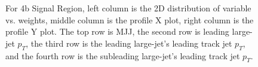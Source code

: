 \begin{figure}[htbp!]
\begin{center}
\caption{For 4b Signal Region, left column is the 2D distribution of variable vs. weights, middle column is the profile X plot, right column is the profile Y plot. The top row is MJJ, the second row is leading large-\R jet $p_{T}$, the third row is the leading large-\R jet's leading track jet $p_{T}$, and the fourth row is the subleading large-\R jet's leading track jet $p_{T}$.}
\label{fig:app-reweight-dist-4b-SR}
\end{center}
\end{figure}


